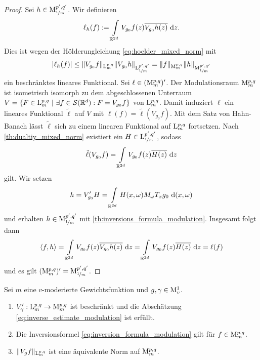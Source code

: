 \begin{proof}
	Sei $ h \in \mathrm{M}^{p^\prime,q^\prime}_{\nicefrac{1}{m}} $. Wir definieren
	\begin{align*}
	\ell_h(f) :=
	\int
	\limits_{\mathbb{R}^{2d}} V_{g_0} f(z) \overline{V_{g_0} h(z)} \text{ d} z.
	\end{align*}
	Dies ist wegen der Hölderungleichung \eqref{eq:hoelder_mixed_norm} mit
	\begin{align*}
	| \ell_h(f) |
	\leq
	\| V_{g_0} f \|_{\mathrm{L}_m^{p,q}}
	\| V_{g_0} h \|_{\mathrm{L}_{\nicefrac{1}{m}}^{p^\prime,q^\prime}}
	=
	\|f \|_{\mathrm{M}_m^{p,q}} \| h \|_{\mathrm{M}_{\nicefrac{1}{m}}^{p^\prime,q^\prime}}
	\end{align*}
	ein beschränktes lineares Funktional.
	Sei $ \ell \in (\mathrm{M}_m^{p,q})^\prime $.
	Der Modulationsraum $ \mathrm{M}_m^{p,q} $ ist isometrisch isomorph zu dem abgeschlossenen Unterraum $ V = \{ F \in \mathrm{L}_m^{p,q} \ | \ \exists f \in \mathcal{S}(\mathbb{R}^d) :  F = V_{g_0} f\} $ von $ \mathrm{L}_m^{p,q} $. 
	Damit induziert $ \ell $ ein lineares Funktional $ \tilde{\ell} $ auf $ V $
	mit $ \ell(f) = \tilde{\ell}(V_{g_0} f) $.
	Mit dem Satz von Hahn-Banach  lässt $ \tilde{\ell}  $ sich zu einem linearen Funktional auf $ \mathrm{L}_m^{p,q} $ fortsetzen.
	Nach \ref{th:dualtiy_mixed_norm} existiert ein $ H \in \mathrm{L}^{p^\prime,q^\prime}_{\nicefrac{1}{m}} $, sodass
	\begin{align*}
	\tilde{\ell}(V_{g_0} f)
	=
	\int \limits_{\mathbb{R}^{2d}}
	V_{g_0} f(z) \overline{H(z)} \text{ d} z
	\end{align*}
	gilt. 
	Wir setzen 
	\begin{align*}
	h = V_{g_0}^\prime H= 
	\int 
	\limits_{\mathbb{R}^{2d}} H(x,\omega) M_\omega T_x g_0 \text{ d} (x, \omega)
	\end{align*}
	und erhalten $ h \in \mathrm{M}^{p^\prime,q^\prime}_{\nicefrac{1}{m}} $ mit \ref{th:inversions_formula_modulation}.
	Insgesamt folgt dann
	\begin{align*}
	\langle f, h \rangle
	=
	\int 
	\limits_{\mathbb{R}^{2d}}
	V_{g_0} f(z) \overline{V_{g_0 } h(z)} \text{ d} z
	=
	\int 
	\limits_{\mathbb{R}^{2d}}
	V_{g_0} f(z) \overline{H(z)} \text{ d} z
	=
	\ell(f)
	\end{align*}
	und es gilt $ (\mathrm{M}_m^{p,q} )^\prime = \mathrm{M}^{p^\prime,q^\prime}_{\nicefrac{1}{m}}  $.
\end{proof}
\newpage
\begin{sz}\label{th:mod_space_window_extention}
	Sei $ m $ eine $ v $-moderierte Gewichtsfunktion und $ g, \gamma \in \mathrm{M}_v^1 $.
	\begin{enumerate}[label =\textbf{(\roman*)}]
		\item 
		$ V^\prime_\gamma : \mathrm{L}_m^{p,q} \to \mathrm{M}_m^{p,q} $ ist beschränkt und die Abschätzung \eqref{eq:inverse_estimate_modulation} ist erfüllt.
		
		\item 
		Die Inversionsformel \eqref{eq:inversion_formula_modulation} gilt für $ f \in \mathrm{M}_m^{p,q} $.
		
		\item
		$ \| V_g  f\|_{\mathrm{L}_m^{p,q}} $ ist eine äquivalente Norm auf $ \mathrm{M}_m^{p,q} $.
	\end{enumerate}

\end{sz}


